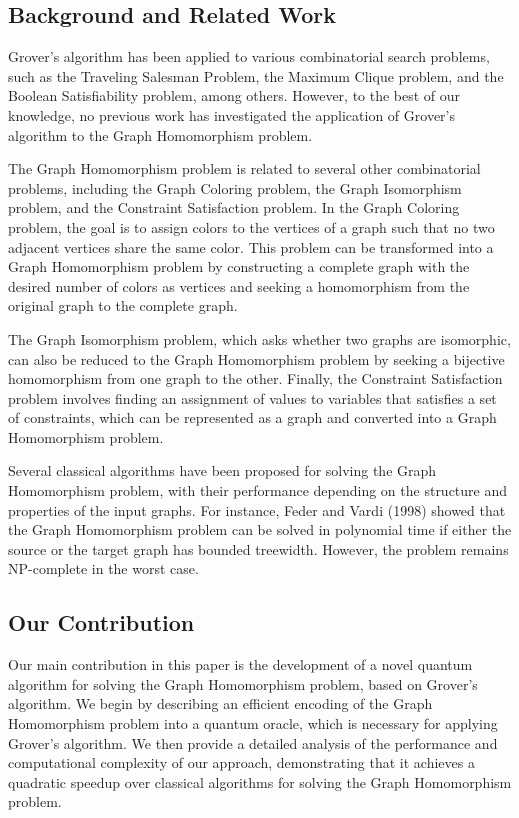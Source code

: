\subsection{Background and Related Work}

Grover's algorithm has been applied to various combinatorial search problems, such as the Traveling Salesman Problem, the Maximum Clique problem, and the Boolean Satisfiability problem, among others. However, to the best of our knowledge, no previous work has investigated the application of Grover's algorithm to the Graph Homomorphism problem.

The Graph Homomorphism problem is related to several other combinatorial problems, including the Graph Coloring problem, the Graph Isomorphism problem, and the Constraint Satisfaction problem. In the Graph Coloring problem, the goal is to assign colors to the vertices of a graph such that no two adjacent vertices share the same color. This problem can be transformed into a Graph Homomorphism problem by constructing a complete graph with the desired number of colors as vertices and seeking a homomorphism from the original graph to the complete graph. 

The Graph Isomorphism problem, which asks whether two graphs are isomorphic, can also be reduced to the Graph Homomorphism problem by seeking a bijective homomorphism from one graph to the other. Finally, the Constraint Satisfaction problem involves finding an assignment of values to variables that satisfies a set of constraints, which can be represented as a graph and converted into a Graph Homomorphism problem.

Several classical algorithms have been proposed for solving the Graph Homomorphism problem, with their performance depending on the structure and properties of the input graphs. For instance, Feder and Vardi (1998) showed that the Graph Homomorphism problem can be solved in polynomial time if either the source or the target graph has bounded treewidth. However, the problem remains NP-complete in the worst case.

\subsection{Our Contribution}

Our main contribution in this paper is the development of a novel quantum algorithm for solving the Graph Homomorphism problem, based on Grover's algorithm. We begin by describing an efficient encoding of the Graph Homomorphism problem into a quantum oracle, which is necessary for applying Grover's algorithm. We then provide a detailed analysis of the performance and computational complexity of our approach, demonstrating that it achieves a quadratic speedup over classical algorithms for solving the Graph Homomorphism problem.

